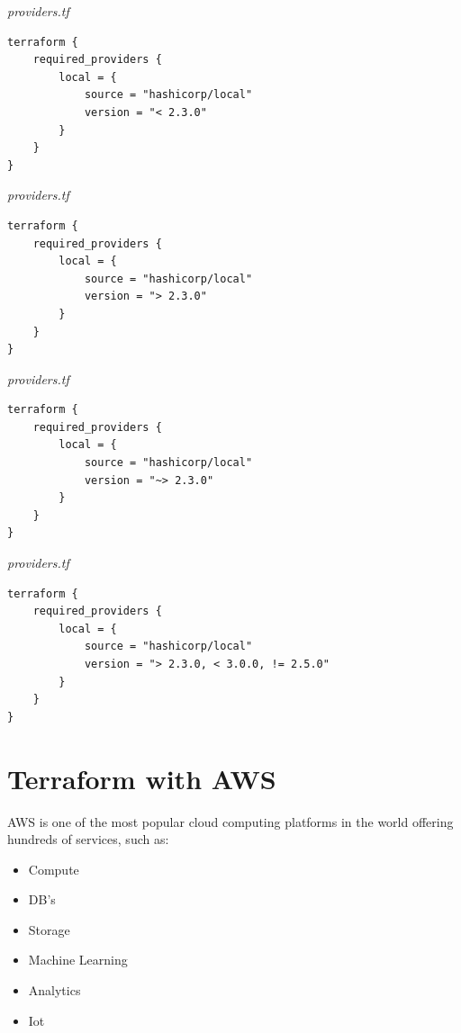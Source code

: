 \documentclass{article}
\newenvironment{codetemplate}[1][]{%
  \mybasecolorbox[#1]
  \itshape
}{%
  \endmybasecolorbox
}
\begin{document}
\begin{codetemplate}{providers.tf}
\begin{verbatim}
terraform {
    required_providers {
        local = {
            source = "hashicorp/local"
            version = "< 2.3.0"
        }
    }
}
\end{verbatim}
\end{codetemplate}

\begin{codetemplate}{providers.tf}
\begin{verbatim}
terraform {
    required_providers {
        local = {
            source = "hashicorp/local"
            version = "> 2.3.0"
        }
    }
}
\end{verbatim}
\end{codetemplate}

\begin{codetemplate}{providers.tf}
\begin{verbatim}
terraform {
    required_providers {
        local = {
            source = "hashicorp/local"
            version = "~> 2.3.0"
        }
    }
}
\end{verbatim}
\end{codetemplate}

\begin{codetemplate}{providers.tf}
\begin{verbatim}
terraform {
    required_providers {
        local = {
            source = "hashicorp/local"
            version = "> 2.3.0, < 3.0.0, != 2.5.0"
        }
    }
}
\end{verbatim}
\end{codetemplate}

\newpage
\section{Terraform with AWS}
AWS is one of the most popular cloud computing platforms in the world offering hundreds of services, such as:
\begin{itemize}
    \item Compute
    \item DB's
    \item Storage
    \item Machine Learning
    \item Analytics
    \item Iot
\end{itemize}
\end{document}
